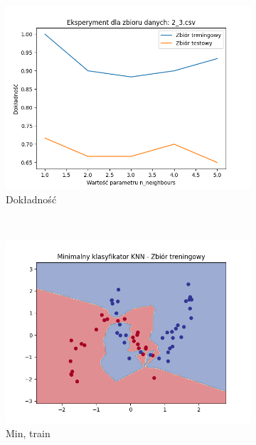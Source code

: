 \documentclass[12pt]{article}
\newcommand*{\subfigwidth}{0.24\textwidth}
\begin{document}
\begin{figure}[H]\centering
    \begin{subfigure}[t]{\subfigwidth}
        \includegraphics[width=\linewidth]{img/exp_3/knn/2_3/accuracy.png}
        \caption{Dokładność}
    \end{subfigure}
    \\
    \begin{subfigure}[t]{\subfigwidth}
        \includegraphics[width=\linewidth]{img/exp_3/knn/2_3/min/train_boundary.png}
        \caption{Min, train}
    \end{subfigure}
    \hfill
    \begin{subfigure}[t]{\subfigwidth}

\end{subfigure}
\end{figure}
\end{document}
